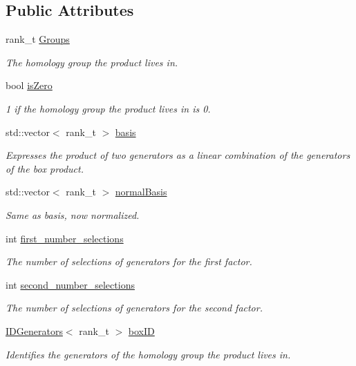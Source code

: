 \subsection*{Public Attributes}
\begin{DoxyCompactItemize}
\item 
rank\+\_\+t \hyperlink{classMackey_1_1Green_acfa5ea708949024bd24f1c1e21399cbc}{Groups}
\begin{DoxyCompactList}\small\item\em The homology group the product lives in. \end{DoxyCompactList}\item 
bool \hyperlink{classMackey_1_1Green_a12a01a6d1715538af0bdc6b34fad6b85}{is\+Zero}
\begin{DoxyCompactList}\small\item\em 1 if the homology group the product lives in is 0. \end{DoxyCompactList}\item 
std\+::vector$<$ rank\+\_\+t $>$ \hyperlink{classMackey_1_1Green_a9cfc633ccb548d2d516450399c108174}{basis}
\begin{DoxyCompactList}\small\item\em Expresses the product of two generators as a linear combination of the generators of the box product. \end{DoxyCompactList}\item 
std\+::vector$<$ rank\+\_\+t $>$ \hyperlink{classMackey_1_1Green_a18135b4b1a4aceb387519832a487206a}{normal\+Basis}
\begin{DoxyCompactList}\small\item\em Same as basis, now normalized. \end{DoxyCompactList}\item 
int \hyperlink{classMackey_1_1Green_a18ba76e7f7b71c1e5fca23bc71accf86}{first\+\_\+number\+\_\+selections}
\begin{DoxyCompactList}\small\item\em The number of selections of generators for the first factor. \end{DoxyCompactList}\item 
int \hyperlink{classMackey_1_1Green_a1240acdc0e901e496597eab2d0ef27f2}{second\+\_\+number\+\_\+selections}
\begin{DoxyCompactList}\small\item\em The number of selections of generators for the second factor. \end{DoxyCompactList}\item 
\hyperlink{classMackey_1_1IDGenerators}{I\+D\+Generators}$<$ rank\+\_\+t $>$ \hyperlink{classMackey_1_1Green_aea166896ebdaa17b3c5d21b2ae936e0d}{box\+ID}
\begin{DoxyCompactList}\small\item\em Identifies the generators of the homology group the product lives in. \end{DoxyCompactList}\end{DoxyCompactItemize}


